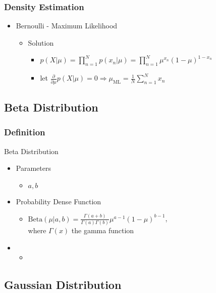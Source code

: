 \subsubsection{Density Estimation}
\begin{itemize}
\item Bernoulli - Maximum Likelihood
	\begin{itemize}
	\item Solution
		\begin{itemize}
		\item $p(X|\mu) = \prod_{n=1}^N p(x_n|\mu) = \prod_{n=1}^N \mu^{x_n}(1-\mu)^{1-x_n}$
		\item let $\frac{\partial}{\partial \mu} p(X|\mu) = 0 \Rightarrow \mu_\text{ML}=\frac1N \sum_{n=1}^N x_n$
		\end{itemize}
	\end{itemize}

\end{itemize}

\subsection{Beta Distribution}

\subsubsection{Definition}
\item Beta Distribution
	\begin{itemize}
	\item Parameters
		\begin{itemize}
		\item $a, b$
		\end{itemize}
	\item Probability Dense Function
		\begin{itemize}
		\item $\text{Beta}(\mu|a, b) = \frac{\Gamma(a+b)}{\Gamma(a)\Gamma(b)} \mu^{a-1}(1-\mu)^{b-1}$, \\
		where $\Gamma(x)$ the gamma function
		\end{itemize}
	\item 
		\begin{itemize}
		\item 
		\end{itemize}
	\end{itemize}


\subsection{Gaussian Distribution}
 
